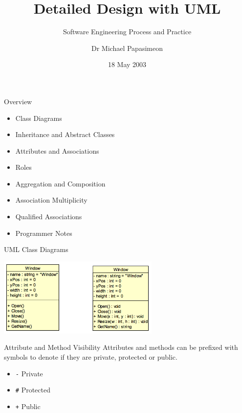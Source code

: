 \documentclass[aspectratio=1610,xcolor=dvipsnames,t,compress]{beamer}
\title[Software Engineering]{Detailed Design with UML}
\subtitle{Software Engineering Process and Practice}
\author[Michael Papasimeon]{Dr Michael Papasimeon}
\date{18 May 2003}
\begin{document}
\begin{frame}
    \maketitle
\end{frame} 

\begin{frame}{Overview}
    \begin{itemize}
        \item Class Diagrams
        \item Inheritance and Abstract Classes
        \item Attributes and Associations
        \item Roles
        \item Aggregation and Composition
        \item Association Multiplicity
        \item Qualified Associations
        \item Programmer Notes
    \end{itemize}
\end{frame}

\begin{frame}{UML Class Diagrams}
    \begin{center}
        \includegraphics[width=0.6\textwidth]{images/window} 
    \end{center} 
\end{frame}

\begin{frame}{Attribute and Method Visibility} 
    Attributes and methods can be prefixed with symbols to denote if they are
    private, protected or public. 
    \begin{itemize}
        \item \texttt{-} Private
        \item \texttt{\#} Protected
        \item \texttt{+} Public
    \end{itemize}
\end{frame} 
\end{document}
